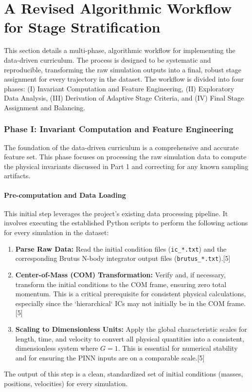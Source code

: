 \part{A Revised Algorithmic Workflow for Stage Stratification}

This section details a multi-phase, algorithmic workflow for implementing the data-driven curriculum. The process is designed to be systematic and reproducible, transforming the raw simulation outputs into a final, robust stage assignment for every trajectory in the dataset. The workflow is divided into four phases: (I) Invariant Computation and Feature Engineering, (II) Exploratory Data Analysis, (III) Derivation of Adaptive Stage Criteria, and (IV) Final Stage Assignment and Balancing.

\section{Phase I: Invariant Computation and Feature Engineering}

The foundation of the data-driven curriculum is a comprehensive and accurate feature set. This phase focuses on processing the raw simulation data to compute the physical invariants discussed in Part 1 and correcting for any known sampling artifacts.

\subsection{Pre-computation and Data Loading}

This initial step leverages the project's existing data processing pipeline. It involves executing the established Python scripts to perform the following actions for every simulation in the dataset:
\begin{enumerate}
    \item \textbf{Parse Raw Data:} Read the initial condition files (\texttt{ic\_*.txt}) and the corresponding Brutus N-body integrator output files (\texttt{brutus\_*.txt}).[5]
    \item \textbf{Center-of-Mass (COM) Transformation:} Verify and, if necessary, transform the initial conditions to the COM frame, ensuring zero total momentum. This is a critical prerequisite for consistent physical calculations, especially since the `hierarchical` ICs may not initially be in the COM frame.[5]
    \item \textbf{Scaling to Dimensionless Units:} Apply the global characteristic scales for length, time, and velocity to convert all physical quantities into a consistent, dimensionless system where $G=1$. This is essential for numerical stability and for ensuring the PINN inputs are on a comparable scale.[5]
\end{enumerate}
The output of this step is a clean, standardized set of initial conditions (masses, positions, velocities) for every simulation.

